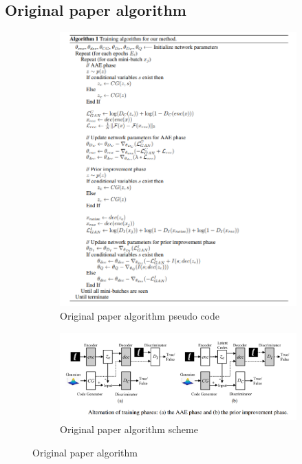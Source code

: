 \documentclass{article}
\begin{document}
    \subsection{Original paper algorithm}

    \begin{center}
        \begin{figure}[H]{\textwidth}
            \begin{subfigure}{0.5\textwidth}
                \centering
                \includegraphics[width=0.75\linewidth]{figures/original-code.png}
                \caption{Original paper algorithm pseudo code}
            \end{subfigure}
            \begin{subfigure}{0.5\textwidth}
                \centering
                \includegraphics[width=0.75\linewidth]{figures/original.png}
                \caption{Original paper algorithm scheme}
            \end{subfigure}%
            \caption{Original paper algorithm}
        \end{figure}
    \end{center}
\end{document}
